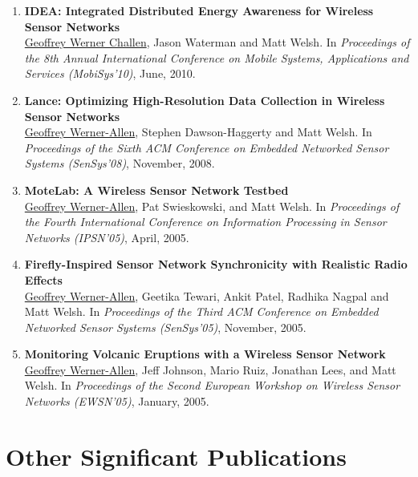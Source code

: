 \begin{enumerate}

\item \textbf{IDEA: Integrated Distributed Energy Awareness for Wireless Sensor
Networks}\\ \uline{Geoffrey Werner Challen}, Jason Waterman and Matt Welsh. In
\emph{Proceedings of the 8th Annual International Conference on Mobile Systems,
Applications and Services (MobiSys’10)}, June, 2010.
\nocite{idea-mobisys10}

\item \textbf{Lance: Optimizing High-Resolution Data Collection in Wireless
Sensor Networks}\\ \uline{Geoffrey Werner-Allen}, Stephen Dawson-Haggerty and
Matt Welsh. In \emph{Proceedings of the Sixth ACM Conference on Embedded
Networked Sensor Systems (SenSys’08)}, November, 2008.
\nocite{lance-sensys08}

\item \textbf{MoteLab: A Wireless Sensor Network Testbed}\\ \uline{Geoffrey
Werner-Allen}, Pat Swieskowski, and Matt Welsh. In \emph{Proceedings of the
Fourth International Conference on Information Processing in Sensor Networks
(IPSN’05)}, April, 2005.
\nocite{motelab-ipsn05}

\item \textbf{Firefly-Inspired Sensor Network Synchronicity with Realistic
Radio Effects}\\ \uline{Geoffrey Werner-Allen}, Geetika Tewari, Ankit Patel,
Radhika Nagpal and Matt Welsh. In \emph{Proceedings of the Third ACM Conference
on Embedded Networked Sensor Systems (SenSys’05)}, November, 2005.
\nocite{firefly-sensys05}

\item \textbf{Monitoring Volcanic Eruptions with a Wireless Sensor Network}\\
\uline{Geoffrey Werner-Allen}, Jeff Johnson, Mario Ruiz, Jonathan Lees, and
Matt Welsh. In \emph{Proceedings of the Second European Workshop on Wireless
Sensor Networks (EWSN’05)}, January, 2005.
\nocite{volcano-ewsn05}

\end{enumerate}


\section{Other Significant Publications}

